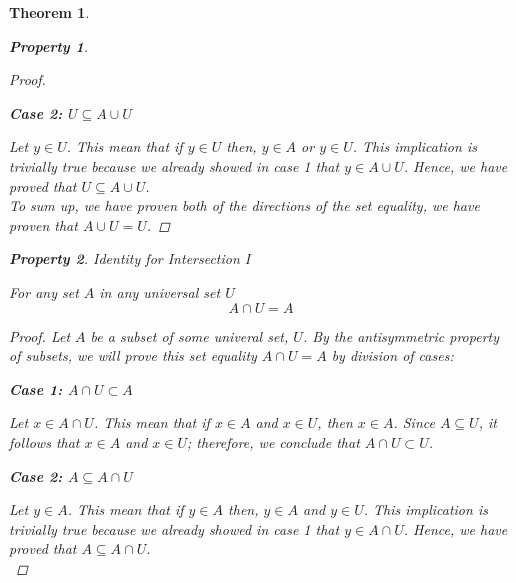 \documentclass{book}
\newtheorem{theorem}{Theorem}[section]
\newtheorem{property}{Property}[theorem]
\theoremstyle{definition}
\theoremstyle{remark}
\begin{document}
\begin{theorem}
\begin{property}
\begin{proof}
            \begin{flushleft} \textbf{Case 2: $U \subseteq A \cup U$} \end{flushleft} 
                Let $y \in U$. This mean that if  $y \in U$ then, $y \in A$ or $y \in U$. This implication  is trivially true because we already showed in \textit{case 1} that $y \in A \cup U$. Hence, we have proved that $U \subseteq A \cup U$. \\
            
            To sum up, we have proven both of the directions of the set equality, we have proven that $A \cup U = U$. 
        \end{proof}
    \end{property}
    
    
    
    \newpage
    \begin{property}
    Identity for Intersection I \\
        \begin{tcolorbox}
            For any set $A$ in any universal set $U$
                \begin{equation*}
                    A \cap U = A
                \end{equation*}
        \end{tcolorbox}
    
        \begin{proof}
            Let $A$ be a subset of some univeral set, $U$. By the antisymmetric property of subsets, we will prove this set equality $A \cap U = A$ by division of cases:
            
            \begin{flushleft} \textbf{Case 1: $A \cap U \subset A$} \end{flushleft}
                Let $x \in A \cap U $. This mean that if $x \in A$ and $x \in U$, then $x \in A$. Since $A \subseteq U$, it follows that $x \in A$ and $x \in U$; therefore, we conclude that $A \cap U \subset U$.
            
            \begin{flushleft} \textbf{Case 2: $A \subseteq A \cap U$} \end{flushleft} 
                Let $y \in A$. This mean that if  $y \in A$ then, $y \in A$ and $y \in U$. This implication  is trivially true because we already showed in \textit{case 1} that $y \in A \cap U$. Hence, we have proved that $A \subseteq A \cap U$. \\
            

\end{proof}
\end{property}
\end{theorem}
\end{document}
